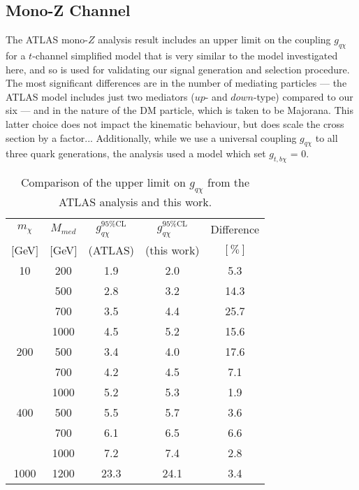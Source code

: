 \subsection{Mono-Z Channel}
\label{monoZ_validation}
\begin{flushleft}

\bigskip

The ATLAS mono-$Z$ analysis result includes an upper limit on the coupling $g_{q \chi}$ for a $t$-channel simplified model that is very similar to the model investigated here, and so is used for validating our signal generation and selection procedure. The most significant differences are in the number of mediating particles --- the ATLAS model includes just two mediators ($up$- and $down$-type) compared to our six --- and in the nature of the DM particle, which is taken to be Majorana. This latter choice does not impact the kinematic behaviour, but does scale the cross section by a factor... Additionally, while we use a universal coupling $g_{q \chi}$ to all three quark generations, the analysis used a model which set $g_{t,b \chi}$ = 0.

\begin{table}
\begin{center}
\begin{tabular}{ c | c | c | c | c }
\hline
\hline
$m_{\chi}$ & $M_{med}$ & $g_{q \chi}^{95\%\mathrm{CL}}$ & $g_{q \chi}^{95\%\mathrm{CL}}$ & Difference \T \\
$[$GeV$]$ & $[$GeV$]$ & (ATLAS) & (this work) & $[\%]$ \B \\
\hline
10 & 200 & 1.9 & 2.0 & 5.3 \T \\
 & 500 & 2.8 & 3.2 & 14.3 \\
 & 700 & 3.5 & 4.4 & 25.7 \\
 & 1000 & 4.5 & 5.2 & 15.6 \\
200 & 500 & 3.4 & 4.0 & 17.6 \T \\
 & 700 & 4.2 & 4.5 & 7.1 \\
 & 1000 & 5.2 & 5.3 & 1.9 \\
400 & 500 & 5.5 & 5.7 & 3.6 \T \\
 & 700 & 6.1 & 6.5 & 6.6 \\
 & 1000 & 7.2 & 7.4 & 2.8 \\
1000 & 1200 & 23.3 & 24.1 & 3.4 \T \B \\
\hline
\hline
\end{tabular}
\end{center}
\caption{Comparison of the upper limit on $g_{q \chi}$ from the ATLAS analysis \cite{Aad:2014monoZlep} and this work.}
\label{tab:monoZvalidation}
\end{table} 


\end{flushleft}
